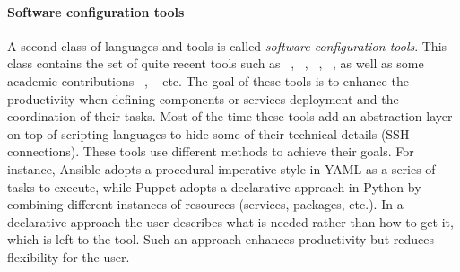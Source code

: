 \paragraph{Software configuration tools}
A second class of languages and tools is called \emph{software configuration tools}. This class contains the set of quite recent tools such as \ansible~\cite{ansible:web}, \puppet~\cite{puppet:web}, \chef~\cite{chef:web},
\salt~\cite{salt:web}, as well as some academic contributions \deployware~\cite{flissi2008ccgrid}, \aeolus~\cite{dicosmo2014ic,dicosmo:hal-01233489} etc. The goal of these tools is to enhance the productivity when defining components or services deployment and the coordination of their tasks. Most of the time these tools add an abstraction layer on top of scripting languages to hide some of their technical details (\eg SSH connections). These tools use different methods to achieve their goals. For instance, Ansible adopts a procedural imperative style in YAML as a series of tasks to execute, while Puppet adopts a declarative approach in Python by combining different instances of resources (\ie services, packages, etc.). In a declarative approach the user describes what is needed rather than how to get it, which is left to the tool. Such an approach enhances productivity but reduces flexibility for the user.

